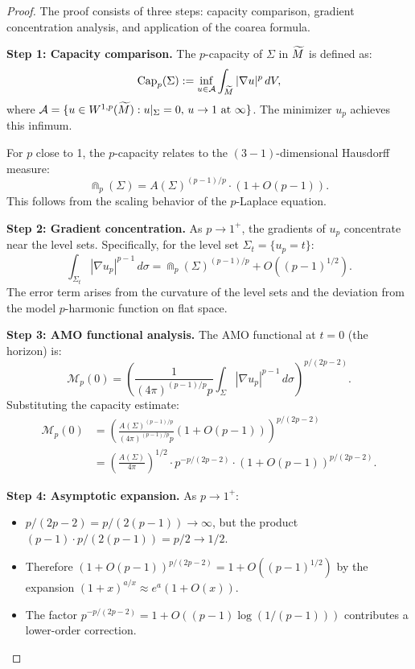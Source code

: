 \begin{proof}
The proof consists of three steps: capacity comparison, gradient concentration analysis, and application of the coarea formula.

\textbf{Step 1: Capacity comparison.}
The $p$-capacity of $\Sigma$ in $\widetilde{M}$ is defined as:
\begin{equation}
    \text{Cap}_p(\Sigma) := \inf_{u \in \mathcal{A}} \int_{\widetilde{M}} |\nabla u|^p \, dV,
\end{equation}
where $\mathcal{A} = \{u \in W^{1,p}(\widetilde{M}) : u|_\Sigma = 0, \, u \to 1 \text{ at } \infty\}$. The minimizer $u_p$ achieves this infimum.

For $p$ close to 1, the $p$-capacity relates to the $(3-1)$-dimensional Hausdorff measure:
\begin{equation}
    \Cap_p(\Sigma) = A(\Sigma)^{(p-1)/p} \cdot \left(1 + O(p-1)\right).
\end{equation}
This follows from the scaling behavior of the $p$-Laplace equation.

\textbf{Step 2: Gradient concentration.}
As $p \to 1^+$, the gradients of $u_p$ concentrate near the level sets. Specifically, for the level set $\Sigma_t = \{u_p = t\}$:
\begin{equation}
    \int_{\Sigma_t} |\nabla u_p|^{p-1} \, d\sigma = \Cap_p(\Sigma)^{(p-1)/p} + O((p-1)^{1/2}).
\end{equation}
The error term arises from the curvature of the level sets and the deviation from the model $p$-harmonic function on flat space.

\textbf{Step 3: AMO functional analysis.}
The AMO functional at $t = 0$ (the horizon) is:
\begin{equation}
    \mathcal{M}_p(0) = \left( \frac{1}{(4\pi)^{(p-1)/p} p} \int_\Sigma |\nabla u_p|^{p-1} \, d\sigma \right)^{p/(2p-2)}.
\end{equation}
Substituting the capacity estimate:
\begin{align}
    \mathcal{M}_p(0) &= \left( \frac{A(\Sigma)^{(p-1)/p}}{(4\pi)^{(p-1)/p} p} (1 + O(p-1)) \right)^{p/(2p-2)} \\
    &= \left( \frac{A(\Sigma)}{4\pi} \right)^{1/2} \cdot p^{-p/(2p-2)} \cdot (1 + O(p-1))^{p/(2p-2)}.
\end{align}

\textbf{Step 4: Asymptotic expansion.}
As $p \to 1^+$:
\begin{itemize}
    \item $p/(2p-2) = p/(2(p-1)) \to \infty$, but the product $(p-1) \cdot p/(2(p-1)) = p/2 \to 1/2$.
    \item Therefore $(1 + O(p-1))^{p/(2p-2)} = 1 + O((p-1)^{1/2})$ by the expansion $(1+x)^{a/x} \approx e^a(1 + O(x))$.
    \item The factor $p^{-p/(2p-2)} = 1 + O((p-1) \log(1/(p-1)))$ contributes a lower-order correction.
\end{itemize}


\end{proof}

